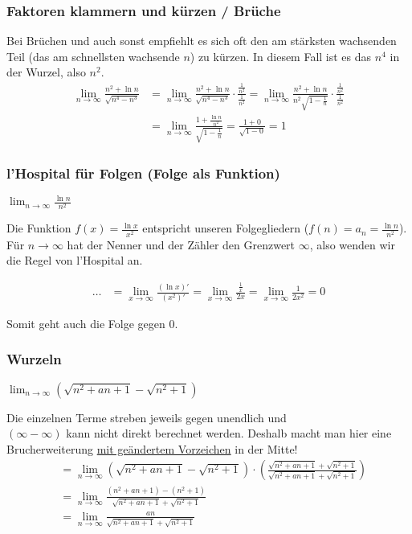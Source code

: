 \subsubsection{Faktoren klammern und kürzen / Brüche}
Bei Brüchen und auch sonst empfiehlt es sich oft den am stärksten wachsenden Teil (das am
schnellsten wachsende $n$) zu kürzen. In diesem Fall ist es das $n^4$ in der
Wurzel, also $n^2$.
\vspace{0.1cm}
\begin{align*}
\lim_{n \to \infty} \frac{n^2 + \ln n}{\sqrt{n^4 - n^3}} 
&= \lim_{n \to \infty} \frac{n^2 + \ln n}{\sqrt{n^4 - n^3}} 
\cdot \frac{\frac{1}{n^2}}{\frac{1}{n^2}} = \lim_{n \to \infty} \frac{n^2 + \ln
n}{n^2 \sqrt{1 - \frac{1}{n}}} \cdot \frac{\frac{1}{n^2}}{\frac{1}{n^2}} \\
&= \lim_{n \to \infty} \frac{1 + \frac{\ln n}{n^2}}{\sqrt{1 - \frac{1}{n}}}
= \frac{1 + 0}{\sqrt{1 - 0}} = 1
\end{align*}

\subsubsection{l'Hospital für Folgen (Folge als Funktion)}
$\lim_{n \to \infty} \frac{\ln n}{n^2}$

Die Funktion $f(x) = \frac{\ln x}{x^2}$ entspricht unseren Folgegliedern ($f(n)
= a_n = \frac{\ln n}{n^2}$). Für $n \to \infty$ hat der Nenner und der Zähler
den Grenzwert $\infty$, also wenden wir die Regel von l'Hospital an.

\begin{align*}
\ldots &= \lim_{x \to \infty} \frac{(\ln x)'}{(x^2)'} = \lim_{x \to \infty}
\frac{\frac{1}{x}}{2x} = \lim_{x \to \infty} \frac{1}{2x^2} = 0
\end{align*}

Somit geht auch die Folge gegen 0.

\subsubsection{Wurzeln}
$\lim_{n \to \infty} (\sqrt{n^2 + an + 1} - \sqrt{n^2 + 1})$

Die einzelnen Terme streben jeweils gegen unendlich und \\
$(\infty - \infty)$ kann nicht direkt berechnet werden. Deshalb macht man hier eine Brucherweiterung \underline{mit geändertem Vorzeichen} in der Mitte!
\begin{align*}
&= \lim_{n \to \infty} (\sqrt{n^2 + an + 1} - \sqrt{n^2 + 1}) \cdot
\left(\frac{\sqrt{n^2 + an + 1} + \sqrt{n^2 + 1}}{\sqrt{n^2 + an + 1} +
\sqrt{n^2 + 1}} \right) \\
&= \lim_{n \to \infty} \frac{(n^2 + an + 1) - (n^2 + 1)}{\sqrt{n^2 + an + 1} +
\sqrt{n^2 + 1}} \\
&= \lim_{n \to \infty} \frac{an}{\sqrt{n^2 + an + 1} + \sqrt{n^2 + 1}} 
\end{align*}

